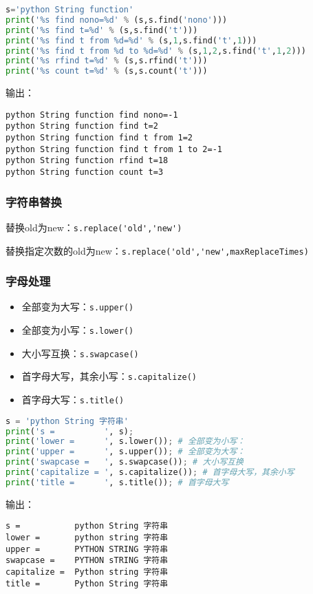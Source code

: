 \begin{lstlisting}[language=python]
s='python String function'
print('%s find nono=%d' % (s,s.find('nono')))
print('%s find t=%d' % (s,s.find('t')))
print('%s find t from %d=%d' % (s,1,s.find('t',1)))
print('%s find t from %d to %d=%d' % (s,1,2,s.find('t',1,2)))
print('%s rfind t=%d' % (s,s.rfind('t')))
print('%s count t=%d' % (s,s.count('t')))
\end{lstlisting}
输出：
\begin{lstlisting}[language=none]
python String function find nono=-1
python String function find t=2
python String function find t from 1=2
python String function find t from 1 to 2=-1
python String function rfind t=18
python String function count t=3
\end{lstlisting}

\subsubsection{字符串替换}

替换old为new：\verb`s.replace('old','new')`

替换指定次数的old为new：\verb`s.replace('old','new',maxReplaceTimes)`


\subsubsection{字母处理}
\begin{itemize}
\item 全部变为大写：\verb`s.upper()`
\item 全部变为小写：\verb`s.lower()`
\item 大小写互换：\verb`s.swapcase()`
\item 首字母大写，其余小写：\verb`s.capitalize()`
\item 首字母大写：\verb`s.title()`
\end{itemize}

\begin{lstlisting}[language=python]
s = 'python String 字符串'
print('s =          ', s);
print('lower =      ', s.lower()); # 全部变为小写：
print('upper =      ', s.upper()); # 全部变为大写：
print('swapcase =   ', s.swapcase()); # 大小写互换
print('capitalize = ', s.capitalize()); # 首字母大写，其余小写
print('title =      ', s.title()); # 首字母大写
\end{lstlisting}
输出：
\begin{lstlisting}[language=none]
s =           python String 字符串
lower =       python string 字符串
upper =       PYTHON STRING 字符串
swapcase =    PYTHON sTRING 字符串
capitalize =  Python string 字符串
title =       Python String 字符串
\end{lstlisting}

